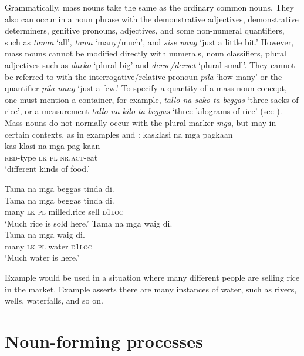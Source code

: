 Grammatically, mass nouns take the same  as the ordinary common nouns. They also can occur in a noun phrase with the demonstrative adjectives, demonstrative determiners, genitive pronouns, adjectives, and some non-numeral quantifiers, such as \textit{tanan} ‘all’, \textit{tama} ‘many/much’, and \textit{sise nang} ‘just a little bit.’ However, mass nouns cannot be modified directly with numerals, noun classifiers, plural adjectives such as \textit{darko} ‘plural big’ and \textit{derse/derset} ‘plural small’. They cannot be referred to with the interrogative/relative pronoun \textit{pila} ‘how many’ or the quantifier \textit{pila nang} ‘just a few.’ To specify a quantity of a mass noun concept, one must mention a container, for example, \textit{tallo na sako ta beggas} ‘three sacks of rice’, or a measurement \textit{tallo na kilo ta beggas} ‘three kilograms of rice’ (see ). Mass nouns do not normally occur with the plural marker \textit{mga}, but may in certain contexts, as in examples  and :
\ea
\label{ex:food}
kasklasi	na	mga	pagkaan \\\smallskip
 \gll kas-klasi	na	mga	pag-kaan \\
\textsc{red}-type \textsc{lk}	\textsc{pl} \textsc{nr.act}-eat \\
\glt ‘different kinds of food.’
\z

\ea
\label{ex:here}
    \ea
    \label{ex:here-a}
    Tama	na	mga	beggas	tinda	di. \\\smallskip
 \gll Tama	na	mga	beggas	tinda	di. \\
    many \textsc{lk} \textsc{pl} milled.rice	sell \textsc{d1loc} \\
    \glt ‘Much rice is sold here.’
    \ex
    \label{ex:here-b}
    Tama	na	mga	waig	di. \\\smallskip
 \gll Tama	na	mga	waig	di. \\
    many	\textsc{lk} \textsc{pl}	water	\textsc{d1loc} \\
    \glt ‘Much water is here.’
    \z
\z

Example  would be used in a situation where many different people are selling rice in the market. Example  asserts there are many instances of water, such as rivers, wells, waterfalls, and so on.

\section{Noun-forming processes}
\label{sec:nounforming}

